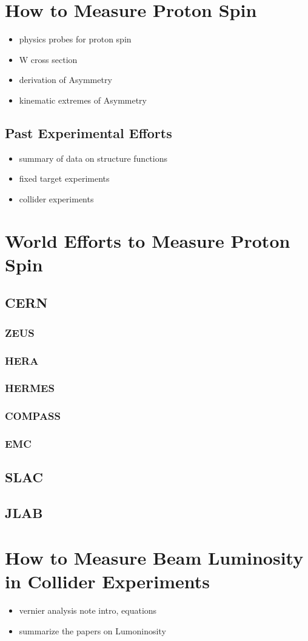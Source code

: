 \section{How to Measure Proton Spin}
\begin{itemize}
		\item physics probes for proton spin
		\item W cross section
		\item derivation of Asymmetry
		\item kinematic extremes of Asymmetry
\end{itemize}
\subsection{Past Experimental Efforts}
\begin{itemize}
		\item summary of data on structure functions
		\item fixed target experiments
		\item collider experiments
\end{itemize}

\section{World Efforts to Measure Proton Spin}
\subsection{CERN}
\subsubsection{ZEUS}
\subsubsection{HERA}
\subsubsection{HERMES}
\subsubsection{COMPASS}
\subsubsection{EMC}
\subsection{SLAC}
\subsection{JLAB}

\section{How to Measure Beam Luminosity in Collider Experiments}
\begin{itemize}
		\item vernier analysis note intro, equations
		\item summarize the papers on Lumoninosity
\end{itemize}
